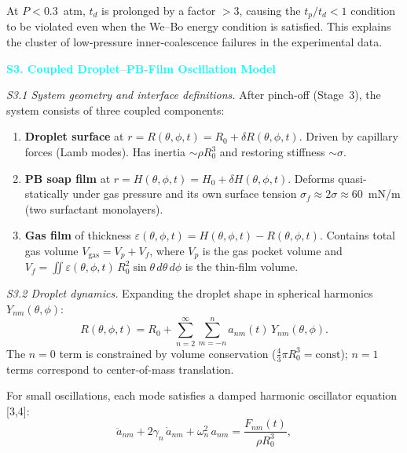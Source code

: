 \documentclass[%
 preprint,
 superscriptaddress,
 amsmath,amssymb,
 aps, prl,
]{revtex4-2}
\begin{document}
At $P < 0.3$~atm, $t_d$ is prolonged by a factor $> 3$, causing the $t_p/t_d < 1$ condition to be violated even when the We--Bo energy condition is satisfied. This explains the cluster of low-pressure inner-coalescence failures in the experimental data.\par

\textcolor{cyan}{\textbf{S3. Coupled Droplet--PB-Film Oscillation Model}}\par

{\noindent\textit{S3.1 System geometry and interface definitions.}}
After pinch-off (Stage~3), the system consists of three coupled components:\par
\begin{enumerate}
\item \textbf{Droplet surface} at $r = R(\theta,\phi,t) = R_0 + \delta R(\theta,\phi,t)$. Driven by capillary forces (Lamb modes). Has inertia $\sim \rho R_0^3$ and restoring stiffness $\sim \sigma$.
\item \textbf{PB soap film} at $r = H(\theta,\phi,t) = H_0 + \delta H(\theta,\phi,t)$. Deforms quasi-statically under gas pressure and its own surface tension $\sigma_f \approx 2\sigma \approx 60$~mN/m (two surfactant monolayers).
\item \textbf{Gas film} of thickness $\varepsilon(\theta,\phi,t) = H(\theta,\phi,t) - R(\theta,\phi,t)$. Contains total gas volume $V_{\text{gas}} = V_p + V_f$, where $V_p$ is the gas pocket volume and $V_f = \iint \varepsilon(\theta,\phi,t)\,R_0^2\sin\theta\,d\theta\,d\phi$ is the thin-film volume.
\end{enumerate}

{\noindent\textit{S3.2 Droplet dynamics.}}
Expanding the droplet shape in spherical harmonics $Y_{nm}(\theta,\phi)$:
\begin{equation}
R(\theta,\phi,t) = R_0 + \sum_{n=2}^{\infty}\sum_{m=-n}^{n} a_{nm}(t)\,Y_{nm}(\theta,\phi).
\label{eq:s3_expansion}
\end{equation}
The $n=0$ term is constrained by volume conservation ($\frac{4}{3}\pi R_0^3 = \text{const}$); $n=1$ terms correspond to center-of-mass translation.\par

For small oscillations, each mode satisfies a damped harmonic oscillator equation [3,4]:
\begin{equation}
\ddot{a}_{nm} + 2\gamma_n\,\dot{a}_{nm} + \omega_n^2\,a_{nm}
= \frac{F_{nm}(t)}{\rho R_0^3},
\label{eq:s3_lamb}
\end{equation}
\end{document}

